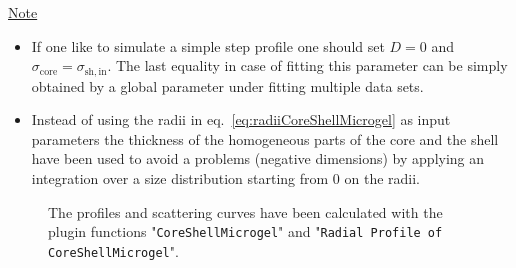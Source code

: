 \noindent
\underline{Note}
\begin{itemize}
  \item If one like to simulate a simple step profile one should set $D=0$ and
        $\sigma_\mathrm{core}=\sigma_\mathrm{sh,in}$. The last equality
        in case of fitting this parameter can be simply obtained by a global parameter
        under fitting multiple data sets.
  \item Instead of using the radii in eq.\ \ref{eq:radiiCoreShellMicrogel} as input parameters the thickness
        of the homogeneous parts of the core and the shell have been used to avoid a problems
        (negative dimensions) by applying an integration over a size distribution starting from 0 on the radii.
\end{itemize}
\begin{figure}[htb]
\captionsetup[subfigure]{position=b}
\centering
{}
\hfill
{}
\caption{The profiles and scattering curves have been calculated with the plugin functions
"\texttt{CoreShellMicrogel}" and "\texttt{Radial Profile of CoreShellMicrogel}".}
\label{fig:profile:Example_CoreShellMicrogel}
\end{figure}

